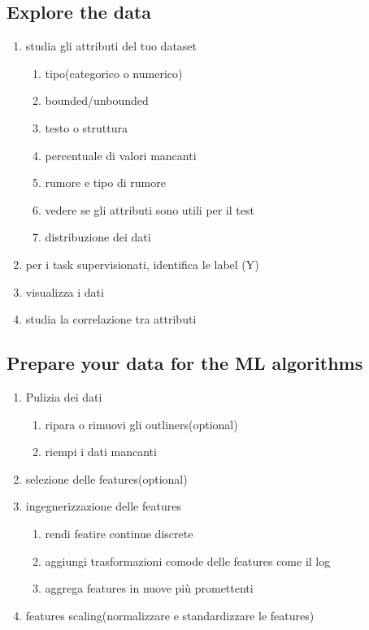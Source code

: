 \subsection{Explore the data}
\begin{enumerate}
    \item studia gli attributi del tuo dataset
    \begin{enumerate}
        \item tipo(categorico o numerico)
        \item bounded/unbounded
        \item testo o struttura
        \item percentuale di valori mancanti
        \item rumore e tipo di rumore
        \item vedere se gli attributi sono utili per il test
        \item distribuzione dei dati
    \end{enumerate}
    \item per i task supervisionati, identifica le label (Y)
    \item visualizza i dati
    \item studia la correlazione tra attributi
\end{enumerate}

\subsection{Prepare your data for the ML algorithms}
\begin{enumerate}
    \item Pulizia dei dati
    \begin{enumerate}
        \item ripara o rimuovi gli outliners(optional)
        \item riempi i dati mancanti
    \end{enumerate}
    \item selezione delle features(optional)
    \item ingegnerizzazione delle features
    \begin{enumerate}
        \item rendi featire continue discrete
        \item aggiungi trasformazioni comode delle features come il log
        \item aggrega features in nuove più promettenti
    \end{enumerate}
    \item features scaling(normalizzare e standardizzare le features)
\end{enumerate}

